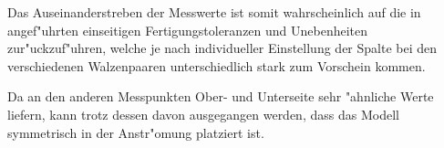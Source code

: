Das Auseinanderstreben der Messwerte ist somit wahrscheinlich auf die in \cite{Bilges.2018} angef"uhrten einseitigen Fertigungstoleranzen und Unebenheiten zur"uckzuf"uhren, welche je nach individueller Einstellung der Spalte bei den verschiedenen Walzenpaaren unterschiedlich stark zum Vorschein kommen.

Da an den anderen Messpunkten Ober- und Unterseite sehr "ahnliche Werte liefern, kann trotz dessen davon ausgegangen werden, dass das Modell symmetrisch in der Anstr"omung platziert ist.



%
%
%
